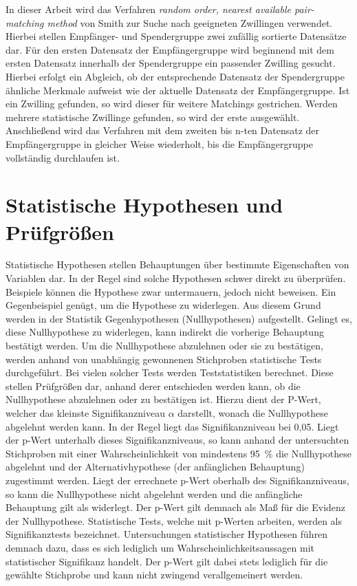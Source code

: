 In dieser Arbeit wird das Verfahren \textit{random order, nearest available pair-matching method} von Smith zur Suche nach geeigneten Zwillingen verwendet. Hierbei stellen Empfänger- und Spendergruppe zwei zufällig sortierte Datensätze dar. Für den ersten Datensatz der Empfängergruppe wird beginnend mit dem ersten Datensatz innerhalb der Spendergruppe ein passender Zwilling gesucht. Hierbei erfolgt ein Abgleich, ob der entsprechende Datensatz der Spendergruppe ähnliche Merkmale aufweist wie der aktuelle Datensatz der Empfängergruppe. Ist ein Zwilling gefunden, so wird dieser für weitere Matchings gestrichen. Werden mehrere statistische Zwillinge gefunden, so wird der erste ausgewählt. Anschließend wird das Verfahren mit dem zweiten bis n-ten Datensatz der Empfängergruppe in gleicher Weise wiederholt, bis die Empfängergruppe vollständig durchlaufen ist. \parencite{smith_matching_1997, bacher_statistisches_2002}

\section{Statistische Hypothesen und Prüfgrößen}

Statistische Hypothesen stellen Behauptungen über bestimmte Eigenschaften von Variablen dar. In der Regel sind solche Hypothesen schwer direkt zu überprüfen. Beispiele können die Hypothese zwar untermauern, jedoch nicht beweisen. Ein Gegenbeispiel genügt, um die Hypothese zu widerlegen. Aus diesem Grund werden in der Statistik Gegenhypothesen (Nullhypothesen) aufgestellt. Gelingt es, diese Nullhypothese zu widerlegen, kann indirekt die vorherige Behauptung bestätigt werden. Um die Nullhypothese abzulehnen oder sie zu bestätigen, werden anhand von unabhängig gewonnenen Stichproben statistische Tests durchgeführt. Bei vielen solcher Tests werden Teststatistiken berechnet. Diese stellen Prüfgrößen dar, anhand derer entschieden werden kann, ob die Nullhypothese abzulehnen oder zu bestätigen ist. Hierzu dient der P-Wert, welcher das kleinste Signifikanzniveau $\alpha$ darstellt, wonach die Nullhypothese abgelehnt werden kann. In der Regel liegt das Signifikanzniveau bei 0,05. Liegt der p-Wert unterhalb dieses Signifikanzniveaus, so kann anhand der untersuchten Stichproben mit einer Wahrscheinlichkeit von mindestens 95~\% die Nullhypothese abgelehnt und der Alternativhypothese (der anfänglichen Behauptung) zugestimmt werden. Liegt der errechnete p-Wert oberhalb des Signifikanzniveaus, so kann die Nullhypothese nicht abgelehnt werden und die anfängliche Behauptung gilt als widerlegt. Der p-Wert gilt demnach als Maß für die Evidenz der Nullhypothese. Statistische Tests, welche mit p-Werten arbeiten, werden als Signifikanztests bezeichnet. Untersuchungen statistischer Hypothesen führen demnach dazu, dass es sich lediglich um Wahrscheinlichkeitsaussagen mit statistischer Signifikanz handelt. Der p-Wert gilt dabei stets lediglich für die gewählte Stichprobe und kann nicht zwingend verallgemeinert werden. \parencite{hedderich_angewandte_2016}

